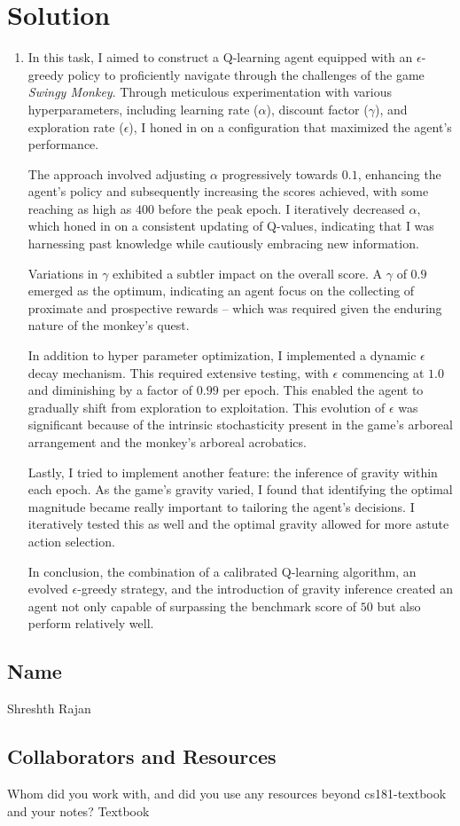 \documentclass[submit]{harvardml}
\newenvironment{solution}
  {\color{blue}\section*{Solution}}
{}
\begin{document}
\begin{solution}

\begin{enumerate}
\item In this task, I aimed to construct a Q-learning agent equipped with an $\epsilon$-greedy policy to proficiently navigate through the challenges of the game \textit{Swingy Monkey}. Through meticulous experimentation with various hyperparameters, including learning rate ($\alpha$), discount factor ($\gamma$), and exploration rate ($\epsilon$), I honed in on a configuration that maximized the agent's performance.

The approach involved adjusting $\alpha$ progressively towards $0.1$, enhancing the agent's policy and subsequently increasing the scores achieved, with some reaching as high as $400$ before the peak epoch. I iteratively decreased $\alpha$, which honed in on a consistent updating of Q-values, indicating that I was harnessing past knowledge while cautiously embracing new information. 

Variations in $\gamma$ exhibited a subtler impact on the overall score. A $\gamma$ of $0.9$ emerged as the optimum, indicating an agent focus on the collecting of proximate and prospective rewards -- which was required given the enduring nature of the monkey's quest.

In addition to hyper parameter optimization, I implemented a dynamic $\epsilon$ decay mechanism. This required extensive testing, with $\epsilon$ commencing at $1.0$ and diminishing by a factor of $0.99$ per epoch. This enabled the agent to gradually shift from exploration to exploitation. This evolution of $\epsilon$ was significant because of the intrinsic stochasticity present in the game's arboreal arrangement and the monkey's arboreal acrobatics.

Lastly, I tried to implement another feature: the inference of gravity within each epoch. As the game's gravity varied, I found that identifying the optimal magnitude became really important to tailoring the agent's decisions. I iteratively tested this as well and the optimal gravity allowed for more astute action selection.

In conclusion, the combination of a calibrated Q-learning algorithm, an evolved $\epsilon$-greedy strategy, and the introduction of gravity inference created an agent not only capable of surpassing the benchmark score of $50$ but also perform relatively well.

\end{enumerate}
\end{solution}

\newpage
\newpage
\subsection*{Name} Shreshth Rajan
\subsection*{Collaborators and Resources}
Whom did you work with, and did you use any resources beyond cs181-textbook and your notes? Textbook
\end{document}
